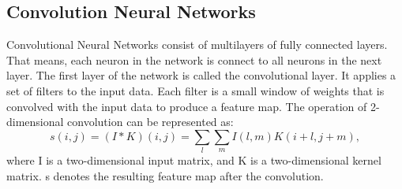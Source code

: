 \subsection{Convolution Neural Networks}
Convolutional Neural Networks consist of multilayers of fully connected layers. That means, each neuron in the network is connect to all neurons in the next layer. The first layer of the network is called the convolutional layer. It applies a set of filters to the input data. Each filter is a small window of weights that is convolved with the input data to produce a feature map. The operation of 2-dimensional convolution can be represented as:
%
\begin{equation*}s(i,j)=(I*K)(i,j)=\sum \limits _{l}{\sum \limits _{m}{I(l,m)K(i+l,j+m)}},\tag{5}\end{equation*}
%
where I is a two-dimensional input matrix, and K is a two-dimensional kernel matrix. s denotes the resulting feature map after the convolution.

